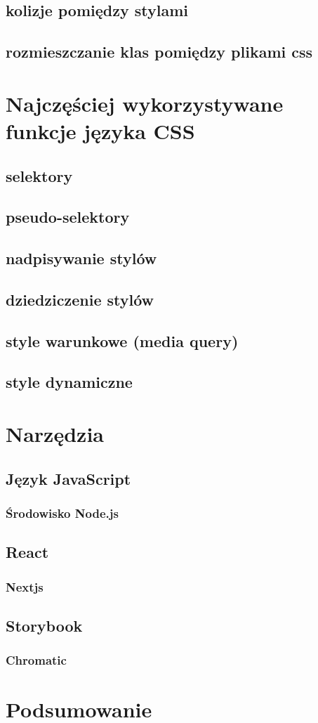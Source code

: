 \documentclass[a4paper,12pt]{book} %
\begin{document}
\section{kolizje pomiędzy stylami}
\section{rozmieszczanie klas pomiędzy plikami css}

\chapter{Najczęściej wykorzystywane funkcje języka CSS}
\section{selektory}
\section{pseudo-selektory}
\section{nadpisywanie stylów}
\section{dziedziczenie stylów}
\section{style warunkowe (media query)}
\section{style dynamiczne}


\chapter{Narzędzia}
\section{Język JavaScript}
\subsection{Środowisko Node.js}
\section{React}
\subsection{Nextjs}
\section{Storybook}
\subsection{Chromatic}


\chapter*{Podsumowanie}





\end{document}
